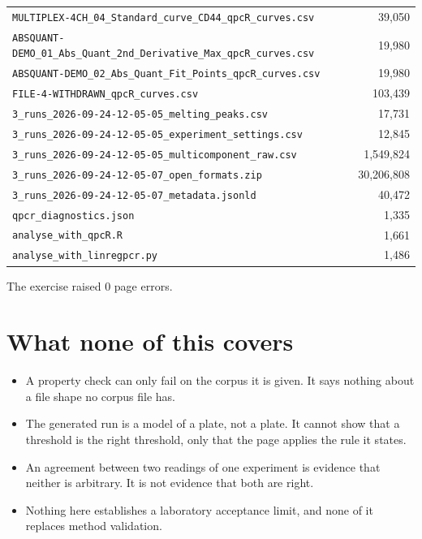 {\begin{xltabular}{\linewidth}{|X|r|}
\texttt{MULTIPLEX-4CH\_04\_Standard\_curve\_CD44\_qpcR\_curves.csv} & 39,050 \\
\texttt{ABSQUANT-DEMO\_01\_Abs\_Quant\_2nd\_Derivative\_Max\_qpcR\_curves.csv} & 19,980 \\
\texttt{ABSQUANT-DEMO\_02\_Abs\_Quant\_Fit\_Points\_qpcR\_curves.csv} & 19,980 \\
\texttt{FILE-4-WITHDRAWN\_qpcR\_curves.csv} & 103,439 \\
\texttt{3\_runs\_2026-09-24-12-05-05\_melting\_peaks.csv} & 17,731 \\
\texttt{3\_runs\_2026-09-24-12-05-05\_experiment\_settings.csv} & 12,845 \\
\texttt{3\_runs\_2026-09-24-12-05-05\_multicomponent\_raw.csv} & 1,549,824 \\
\texttt{3\_runs\_2026-09-24-12-05-07\_open\_formats.zip} & 30,206,808 \\
\texttt{3\_runs\_2026-09-24-12-05-07\_metadata.jsonld} & 40,472 \\
\texttt{qpcr\_diagnostics.json} & 1,335 \\
\texttt{analyse\_with\_qpcR.R} & 1,661 \\
\texttt{analyse\_with\_linregpcr.py} & 1,486 \\
\bottomrule
\end{xltabular}}


The exercise raised 0 page errors.

\section{What none of this covers}
\begin{itemize}
\item A property check can only fail on the corpus it is given. It says nothing
  about a file shape no corpus file has.
\item The generated run is a model of a plate, not a plate. It cannot show that a
  threshold is the right threshold, only that the page applies the rule it states.
\item An agreement between two readings of one experiment is evidence that neither
  is arbitrary. It is not evidence that both are right.
\item Nothing here establishes a laboratory acceptance limit, and none of it
  replaces method validation.
\end{itemize}

